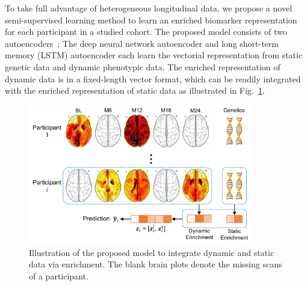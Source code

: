 To take full advantage of heterogeneous longitudinal data, we propose a novel semi-supervised learning method to learn an enriched biomarker representation for each participant in a studied cohort. The proposed model consists of two autoencoders~\cite{kramer1991nonlinear}; The deep neural network autoencoder and long short-term memory (LSTM) autoencoder each learn the vectorial representation from static genetic data and dynamic phenotypic data. The enriched representation of dynamic data is in a fixed-length vector format, which can be readily integrated with the enriched representation of static data as illustrated in Fig.~\ref{fig: overview}.
\begin{figure}[h]
    \centering
    \includegraphics[width=0.87\textwidth]{images/overview.pdf}
    \caption{Illustration of the proposed model to integrate dynamic and static data via enrichment. The blank brain plots denote the missing scans of a participant. 
    } \label{fig: overview}
\end{figure}

